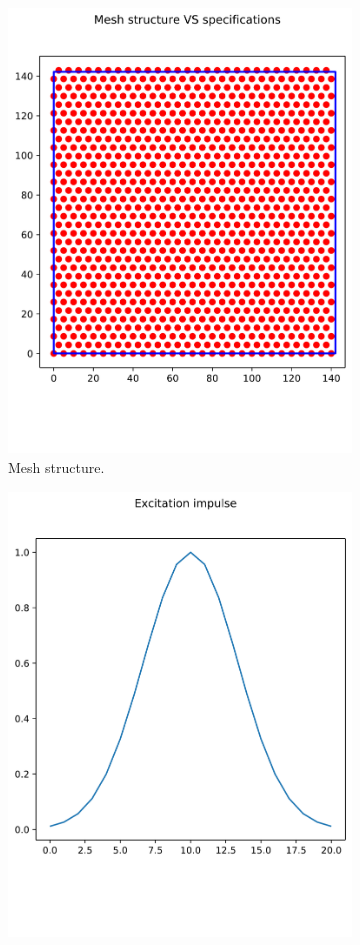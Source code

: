 \documentclass{article}
\begin{document}
\begin{figure}
    \centering
    \begin{subfigure}{.45\textwidth}
      \centering
      \includegraphics[width=0.8\linewidth]{fig/2d-mesh}
      \caption{Mesh structure.}
      \label{fig:2d-mesh}
    \end{subfigure}%
    \begin{subfigure}{.45\textwidth}
      \centering
      \includegraphics[width=0.8\linewidth]{fig/2d-impulse}

\end{subfigure}
\end{figure}
\end{document}
